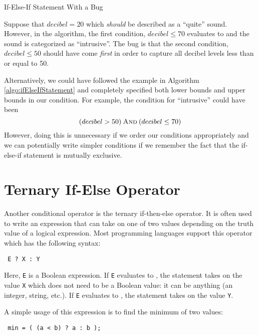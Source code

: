 \begin{algorithm}[H]
\caption{If-Else-If Statement With a Bug}
\label{algo:ifElseIfStatementWithABug}
\end{algorithm}

Suppose that $decibel = 20$ which \emph{should} be described as a
``quite'' sound.  However, in the algorithm, the first condition, $decibel \leq 70$
evaluates to \True and the sound is categorized as ``intrusive''.  The
bug is that the second condition, $decibel \leq 50$ should have come 
\emph{first} in order to capture all decibel levels less than or equal to 50.

Alternatively, we could have followed the example in Algorithm \ref{algo:ifElseIfStatement}
and completely specified both lower bounds and upper bounds in our condition.  
For example, the condition for ``intrusive'' could have been 
  $$(decibel > 50) \mathbin{\textsc{And}} (decibel \leq 70)$$
However, doing this is unnecessary if we order our conditions appropriately 
and we can potentially write simpler conditions if we remember the fact that the
if-else-if statement is mutually exclusive.

\section{Ternary If-Else Operator}

Another conditional operator is the ternary if-then-else operator.  It is often 
used to write an expression that can take on one of two values depending on the
truth value of a logical expression.  Most programming languages support this operator
which has the following syntax:

\texttt{  E ? X : Y}

Here, \texttt{E} is a Boolean expression.  If \texttt{E} evaluates to \True, the
statement takes on the value \texttt{X} which does not need to be a Boolean
value: it can be anything (an integer, string, etc.).  If \texttt{E} evaluates to \False, 
the statement takes on the value \texttt{Y}.  

A simple usage of this expression is to find the minimum of two values: 

\texttt{  min = ( (a < b) ? a : b );} 

